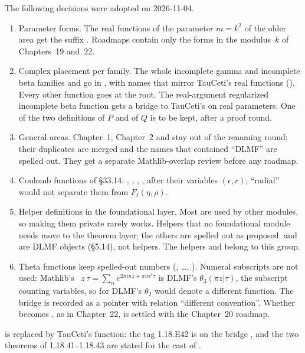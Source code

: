 \documentclass[11pt,a4paper]{article}
\begin{document}
The following decisions were adopted on 2026-11-04.
\begin{enumerate}
  \item Parameter forms. The real functions of the parameter $m=k^2$ of the older
     area get the suffix . Roadmaps contain only the forms in
    the modulus~$k$ of Chapters~19 and~22.
  \item Complex placement per family. The whole incomplete gamma and incomplete beta families
    and  go in , with names that mirror TauCeti's real
    functions (). Every other function goes at the root. The
    real-argument regularized incomplete beta function gets a bridge to TauCeti's on real
    parameters. One of the two definitions of $P$ and of $Q$ is to be kept, after a proof
    round.
  \item General areas. Chapter~1, Chapter~2 and  stay out of the renaming
    round; their duplicates are merged and the names that contained ``DLMF'' are spelled
    out. They get a separate Mathlib-overlap review before any roadmap.
  \item Coulomb functions of \S33.14: , ,
    , , after their variables $(\epsilon,r)$;
    ``radial'' would not separate them from $F_\ell(\eta,\rho)$.
  \item Helper definitions in the foundational layer. Most are used by other modules, so
    making them private rarely works. Helpers that no foundational module needs move to the
    theorem layer; the others are spelled out as proposed.  and
     are DLMF objects (\S5.14), not helpers. The 
    helpers  and  belong to this group.
  \item Theta functions keep spelled-out numbers (,
    \ldots, ). Numeral subscripts are not used: Mathlib's
    ~$z\,\tau=\sum_n e^{2\pi inz+\pi in^2\tau}$ is DLMF's
    $\theta_3(\pi z|\tau)$, the subscript counting variables, so  for DLMF's
    $\theta_2$ would denote a different function. The bridge is recorded as a
     pointer with relation ``different convention''. Whether 
    becomes , as in Chapter~22, is settled with the Chapter~20 roadmap.
\end{enumerate}
 is replaced by TauCeti's function: the tag 1.18.E42 is on the bridge
, and the two theorems of 1.18.41--1.18.43 are stated for the
cast of .
\end{document}
